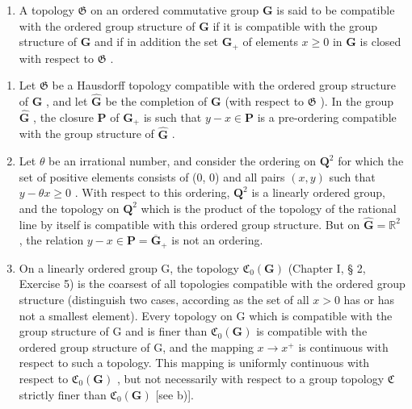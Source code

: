 \BourbakiExercises
\BourbakiExerciseGroup

\begin{enumerate}
\def\labelenumi{\arabic{enumi})}
\tightlist
\item
  A topology \(\mathfrak{G}\) on an ordered commutative group \(\mathbf{G}\) is said to be compatible with the ordered group structure of \(\mathbf{G}\) if it is compatible with the group structure of \(\mathbf{G}\) and if in addition the set \(\mathbf{G}_{+}\) of elements \(x \geqslant 0\) in \(\mathbf{G}\) is closed with respect to \(\mathfrak{G}\) .
\end{enumerate}

\begin{enumerate}
\def\labelenumi{\alph{enumi})}
\item
  Let \(\mathfrak{G}\) be a Hausdorff topology compatible with the ordered group structure of \(\mathbf{G}\) , and let \(\hat{\mathbf{G}}\) be the completion of \(\mathbf{G}\) (with respect to \(\mathfrak{G}\) ). In the group \(\hat{\mathbf{G}}\) , the closure \(\mathbf{P}\) of \(\mathbf{G}_{+}\) is such that \(y - x \in \mathbf{P}\) is a pre-ordering compatible with the group structure of \(\hat{\mathbf{G}}\) .
\item
  Let \(\theta\) be an irrational number, and consider the ordering on \(\mathbf{Q}^2\) for which the set of positive elements consists of (0, 0) and all pairs \((x, y)\) such that \(y - \theta x \geqslant 0\) . With respect to this ordering, \(\mathbf{Q}^2\) is a linearly ordered group, and the topology on \(\mathbf{Q}^2\) which is the product of the topology of the rational line by itself is compatible with this ordered group structure. But on \(\hat{\mathbf{G}} = \mathbb{R}^2\) , the relation \(y - x \in \mathbf{P} = \overline{\mathbf{G}}_+\) is not an ordering.
\item
  On a linearly ordered group G, the topology \(\mathfrak{C}_{0}(\mathbf{G})\) (Chapter I, § 2, Exercise 5) is the coarsest of all topologies compatible with the ordered group structure (distinguish two cases, according as the set of all \(x > 0\) has or has not a smallest element). Every topology on G which is compatible with the group structure of G and is finer than \(\mathfrak{C}_{0}(\mathbf{G})\) is compatible with the ordered group structure of G, and the mapping \(x \to x^{+}\) is continuous with respect to such a topology. This mapping is uniformly continuous with respect to \(\mathfrak{C}_{0}(\mathbf{G})\) , but not necessarily with respect to a group topology \(\mathfrak{C}\) strictly finer than \(\mathfrak{C}_{0}(\mathbf{G})\) {[}see b){]}.
\end{enumerate}

